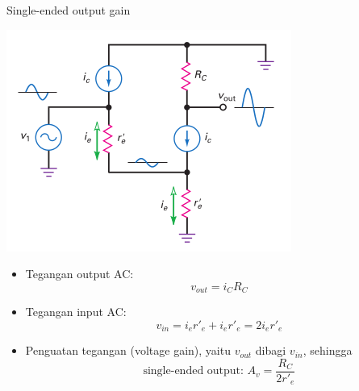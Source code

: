 \documentclass[aspectratio=169]{beamer}
\begin{document}
\begin{frame}{Single-ended output gain}
	\begin{multicols}{2}
		\begin{center}
			\includegraphics[height=0.7\textheight]{gambar/01.simplified_ac-equivalent_circuit}
		\end{center}
		\columnbreak
		\begin{itemize}
			\item Tegangan output AC: $$ v_{out} = i_C R_C $$
			\item Tegangan input AC: $$ v_{in} = i_e r'_e + i_e r'_e = 2i_er'_e $$
			\item Penguatan tegangan (voltage gain), yaitu $ v_{out} $ dibagi $ v_{in} $, sehingga
			\begin{equation}
				\text{single-ended output: } A_v = \frac{R_C}{2r'_e}
			\end{equation}
		\end{itemize}
	\end{multicols}
\end{frame}
\end{document}
